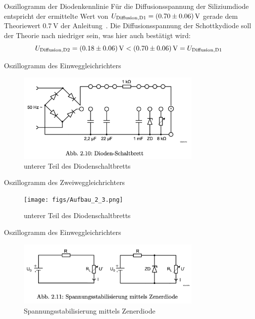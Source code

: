 \documentclass{article}
\theoremstyle{definition}
\begin{document}
\begin{aufgabe}{Oszillogramm der Diodenkennlinie}
    Für die Diffusionsspannung der Siliziumdiode entspricht der ermittelte Wert von $U_\mathrm{Diffusion, D1} = \SI{0.7 +- 0.06}{\volt}$ gerade dem Theoriewert $\SI{0.7}{\volt}$ der Anleitung~\cite{anleitung}. Die Diffusionsspannung der Schottkydiode soll der Theorie nach niedriger sein, was hier auch bestätigt wird: 
    \begin{equation*}
        U_\mathrm{Diffusion, D2} = \SI{0.18 +- 0.06}{\volt} < \SI{0.7 +- 0.06}{\volt} = U_\mathrm{Diffusion, D1}
    \end{equation*}
    
\end{aufgabe}

\begin{aufgabe}{Oszillogramm des Einweggleichrichters}
    \begin{figure}[H]
        \centering
        \includegraphics[width=0.8\textwidth]{figs/fig2_10.png}
        \caption{unterer Teil des Diodenschaltbretts\cite{anleitung}}
        \label{aufbau_2_3}
    \end{figure}
\end{aufgabe}


\begin{aufgabe}{Oszillogramm des Zweiweggleichrichters}
    \begin{figure}[H]
        \centering
        \texttt{[image: figs/Aufbau\_2\_3.png]}
        \caption{unterer Teil des Diodenschaltbretts\cite{anleitung}}
        \label{aufbau_2_3}
    \end{figure}
\end{aufgabe}

\begin{aufgabe}{Oszillogramm des Einweggleichrichters}
    \begin{figure}[H]
        \centering
        \includegraphics[width=0.8\textwidth]{figs/fig2_11.png}
        \caption{Spannungsstabilisierung mittels Zenerdiode~\cite{anleitung}}
        \label{aufbau_2_3}
    \end{figure}
\end{aufgabe}
\end{document}
